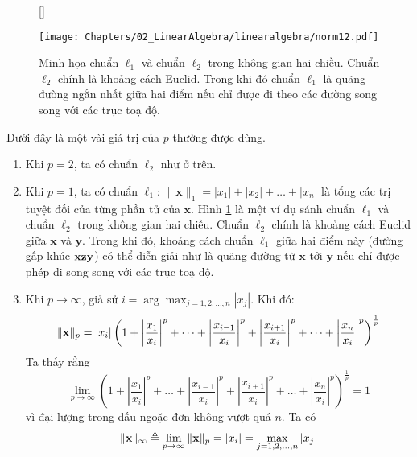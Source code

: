 \begin{figure}[t]
[\FBwidth]
{%
\caption{Minh họa chuẩn $\ell_1$ và chuẩn $\ell_2$ trong không gian hai chiều.
Chuẩn $\ell_2$ chính
là khoảng cách Euclid. Trong khi đó chuẩn $\ell_1$ là quãng
đường ngắn nhất giữa hai điểm nếu chỉ được đi theo các đường song song với
các trục toạ độ.}
\label{fig:norm12}}
{ %
\texttt{[image: Chapters/02\_LinearAlgebra/linearalgebra/norm12.pdf]}
}
\end{figure}
Dưới đây là một vài giá trị của $p$ thường được dùng.
\begin{enumerate}
\item Khi $p = 2$, ta có chuẩn $\ell_2$ như ở trên.

\item Khi $p = 1$, ta có chuẩn $\ell_1$:
$\|\mathbf{x}\|_1 = |x_1| + |x_2| + \dots +|x_n|$ là tổng các trị tuyệt đối
của từng phần tử của $\mathbf{x}$. Hình \ref{fig:norm12} là một ví dụ  sánh
chuẩn $\ell_1$ và chuẩn $\ell_2$ trong không gian hai chiều. Chuẩn $\ell_2$
chính là khoảng cách Euclid giữa $\mathbf{x} $ và
$\mathbf{y}$. Trong khi đó, khoảng cách chuẩn $\ell_1$ giữa hai điểm này
(đường gấp khúc $\mathbf{x}\mathbf{z}\mathbf{y}$) có thể diễn giải như là quãng đường từ $\mathbf{x}
$ tới $\mathbf{y}$ nếu chỉ được phép đi song song với các trục toạ độ.

\item Khi $p \rightarrow \infty $, giả sử
$i = \arg\max_{j=1, 2, \dots, n} |x_j|$. Khi đó:
\begin{equation}
\|\mathbf{x}\|_p = |x_i|\left(1 + \left|\frac{x_1}{x_i}\right|^p +
\dots +
\left|\frac{x_{i-1}}{x_i}\right|^p + \left|\frac{x_{i+1}}{x_i}\right|^p
+ \dots +\left|\frac{x_{n}}{x_i}\right|^p\right)^{\frac{1}
{p}}
\end{equation}
Ta thấy rằng
\begin{equation}
\lim_{p \rightarrow \infty}\left(1 + \left|\frac{x_1}{x_i}\right|^p +
\dots +
\left|\frac{x_{i-1}}{x_i}\right|^p + \left|\frac{x_{i+1}}{x_i}\right|^p
+ \dots +\left|\frac{x_{n}}{x_i}\right|^p\right)^{\frac{1}{p}} = 1
\end{equation}
vì đại lượng trong dấu ngoặc đơn không vượt quá $n$. Ta có
\begin{equation}
\|\mathbf{x}\|_{\infty} \triangleq \lim_{p \rightarrow \infty} \|\mathbf{x}\|_{p} =
|x_i| = \max_{j=1, 2, \dots, n} | x_j|
\end{equation}

\end{enumerate}

